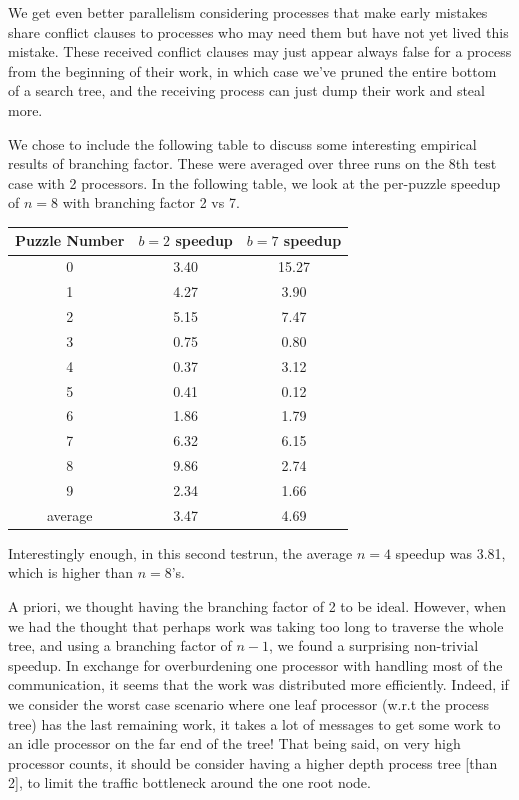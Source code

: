 \documentclass{article}
\begin{document}
We get even better parallelism considering processes that make early mistakes share conflict clauses to processes who may need them but have not yet lived this mistake. These received conflict clauses may just appear always false for a process from the beginning of their work, in which case we've pruned the entire bottom of a search tree, and the receiving process can just dump their work and steal more.

We chose to include the following table to discuss some interesting empirical results of branching factor.
These were averaged over three runs on the 8th test case with 2 processors.
In the following table, we look at the per-puzzle speedup of $n=8$ with branching factor 2 vs 7.

\vspace{12pt}
\begin{tabular}{c|cc}
    \hline
    Puzzle Number & $b=2$ speedup & $b=7$ speedup\\
    \hline
    0 &3.40 & 15.27\\
    1 &4.27 & 3.90\\
    2 &5.15 & 7.47\\
    3 &0.75 & 0.80\\
    4 &0.37 & 3.12\\
    5 &0.41 & 0.12\\
    6 &1.86 & 1.79\\
    7 &6.32 & 6.15\\
    8 &9.86 & 2.74\\
    9 &2.34 & 1.66\\
    \hline
    average & 3.47 & 4.69
\end{tabular}
\label{tab:bf}
\vspace{12pt}

Interestingly enough, in this second testrun, the average $n=4$ speedup was 3.81, which is higher than $n=8$'s.

A priori, we thought having the branching factor of 2 to be ideal.
However, when we had the thought that perhaps work was taking too long to traverse the whole tree, and using a branching factor of $n-1$, we found a surprising non-trivial speedup.
In exchange for overburdening one processor with handling most of the communication, it seems that the work was distributed more efficiently.
Indeed, if we consider the worst case scenario where one leaf processor (w.r.t the process tree) has the last remaining work, it takes a lot of messages to get some work to an idle processor on the far end of the tree!
That being said, on very high processor counts, it should be consider having a higher depth process tree [than 2], to limit the traffic bottleneck around the one root node.
\end{document}
